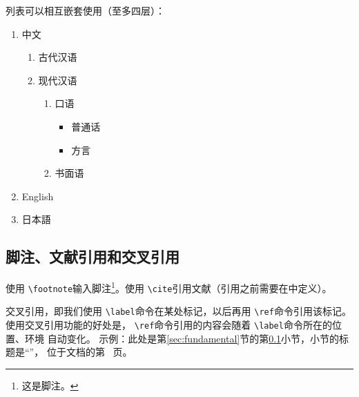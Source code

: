 \documentclass[zihao = -4, linespread = 1.5]{ctexart} %
\begin{document}
列表可以相互嵌套使用（至多四层）：
\begin{enumerate}
  \item 中文
  \begin{enumerate}
    \item 古代汉语
    \item 现代汉语
    \begin{enumerate}
      \item 口语
      \begin{itemize}
        \item 普通话
        \item 方言
      \end{itemize}
      \item 书面语
    \end{enumerate}
  \end{enumerate}
  \item English
  \item 日本語
\end{enumerate}

\subsection{脚注、文献引用和交叉引用}\label{subsec:crossRef}
使用 \texttt{\textbackslash footnote}输入脚注\footnote{这是脚注。 }。使用 \texttt{\textbackslash cite}引用文献\cite{PangQingShan}（引用之前需要在中定义）。

交叉引用，即我们使用 \texttt{\textbackslash label}命令在某处标记，以后再用 \texttt{\textbackslash ref}命令引用该标记。
使用交叉引用功能的好处是， \texttt{\textbackslash ref}命令引用的内容会随着 \texttt{\textbackslash label}命令所在的位置、环境
自动变化。
示例：此处是第\ref{sec:fundamental}节的第\ref{subsec:crossRef}小节，小节的标题是“”，
位于文档的第~\pageref{subsec:crossRef} 页。%

\end{document}
